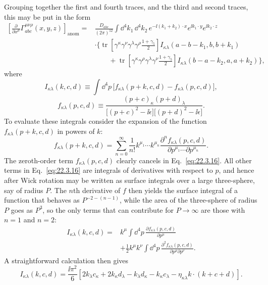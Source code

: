 Grouping together the first and fourth traces, and the third and second
traces, this may be put in the form
\begin{equation}
 \begin{aligned}
 \left[
  \frac{\partial}{\partial x^\mu}
  \Gamma_{abc}^{\mu\nu\rho}(x,y,z)
 \right]_{\mathrm{anom}}
 ={}&\frac{D_{abc}}{(2\pi)^{12}}
 \int \dd^4k_1\,\dd^4k_2\,
 e^{-\ii(k_1+k_2)\cdot x}e^{\ii k_1\cdot y}e^{\ii k_2\cdot z}
 \\
 &\cdot\Biggl\{
 \operatorname{tr}\!\left[
  \gamma^\kappa\gamma^\nu\gamma^\lambda\gamma^\rho
  \frac{1+\gamma_5}{2}
 \right]
 I_{\kappa\lambda}(a-b-k_1,b,b+k_1)
 \\
 &\qquad+
 \operatorname{tr}\!\left[
  \gamma^\kappa\gamma^\rho\gamma^\lambda\gamma^\nu
  \frac{1+\gamma_5}{2}
 \right]
 I_{\kappa\lambda}(b-a-k_2,a,a+k_2)
 \Biggr\},
 \end{aligned}
 \tag{22.3.15}\label{eq:22.3.15}
\end{equation}
where
\begin{equation}
 I_{\kappa\lambda}(k,c,d)
 \equiv\int \dd^4p\,
 \bigl[
  f_{\kappa\lambda}(p+k,c,d)-f_{\kappa\lambda}(p,c,d)
 \bigr],
 \tag{22.3.16}\label{eq:22.3.16}
\end{equation}
\begin{equation}
 f_{\kappa\lambda}(p,c,d)
 \equiv
 \frac{(p+c)_\kappa(p+d)_\lambda}
 {\bigl[(p+c)^2-\ii\epsilon\bigr]\bigl[(p+d)^2-\ii\epsilon\bigr]}.
 \tag{22.3.17}\label{eq:22.3.17}
\end{equation}
To evaluate these integrals consider the expansion of the function
$f_{\kappa\lambda}(p+k,c,d)$ in powers of $k$:
\[
 f_{\kappa\lambda}(p+k,c,d)
 =\sum_{n=0}^{\infty}\frac{1}{n!}
 k^{\mu_1}\cdots k^{\mu_n}
 \frac{\partial^n f_{\kappa\lambda}(p,c,d)}
 {\partial p^{\mu_1}\cdots\partial p^{\mu_n}}.
\]
The zeroth-order term $f_{\kappa\lambda}(p,c,d)$ clearly cancels in
Eq.~\eqref{eq:22.3.16}. All other terms in Eq.~\eqref{eq:22.3.16} are
integrals of derivatives with respect to $p$, and hence after Wick rotation
may be written as surface integrals over a large three-sphere, say of radius
$P$. The $n$th derivative of $f$ then yields the surface integral of a
function that behaves as $P^{-2-(n-1)}$, while the area of the three-sphere
of radius $P$ goes as $P^3$, so the only terms that can contribute for
$P\to\infty$ are those with $n=1$ and $n=2$:
\begin{equation}
 \begin{aligned}
 I_{\kappa\lambda}(k,c,d)
 ={}&k^\mu\int \dd^4p\,
 \frac{\partial f_{\kappa\lambda}(p,c,d)}{\partial p^\mu}
 \\
 &+\frac12k^\mu k^\nu\int \dd^4p\,
 \frac{\partial^2 f_{\kappa\lambda}(p,c,d)}
 {\partial p^\mu\partial p^\nu}.
 \end{aligned}
 \tag{22.3.18}\label{eq:22.3.18}
\end{equation}
A straightforward calculation then gives
\begin{equation}
 I_{\kappa\lambda}(k,c,d)
 =\frac{\ii\pi^2}{6}
 \left[
  2k_\lambda c_\kappa+2k_\kappa d_\lambda
  -k_\lambda d_\kappa-k_\kappa c_\lambda
  -\eta_{\kappa\lambda}k\cdot(k+c+d)
 \right].
 \tag{22.3.19}\label{eq:22.3.19}
\end{equation}

